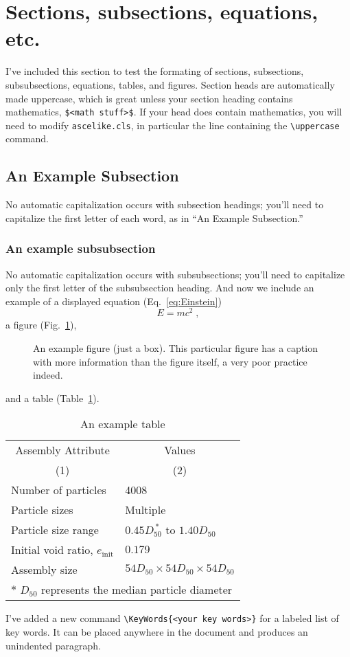 \documentclass[Proceedings]{ascelike}
\begin{document}
\section{Sections, subsections, equations, etc.}
I've included this section to test the formating of sections, subsections,
subsubsections, equations, tables, and figures.
Section heads are automatically made uppercase, which is great unless
your section heading contains mathematics, \verb+$<math stuff>$+.
If your head does contain mathematics, you will need to modify
\texttt{ascelike.cls}, in particular the line containing the
\verb+\uppercase+ command.
%
\subsection{An Example Subsection}
No automatic capitalization occurs with subsection headings; 
you'll need to capitalize the first letter of each word,
as in ``An Example Subsection.''
%
\subsubsection{An example subsubsection}
No automatic capitalization occurs with subsubsections; 
you'll need to capitalize only the first letter of the subsubsection heading.
And now we include an example of a displayed equation (Eq.~\ref{eq:Einstein})
%
\begin{equation} \label{eq:Einstein}
E = m c^{2} \;,
\end{equation}
%
a figure (Fig.~\ref{fig:box_fig}), 
%
\begin{figure}
\centering
\framebox[3.00in]{\rule[0in]{0in}{1.00in}}
\caption{An example figure (just a box).  
This particular figure has a caption with more information 
than the figure itself, a very poor practice indeed.}
\label{fig:box_fig}
\end{figure}
%
and a table (Table~\ref{table:assembly}).
%
\begin{table}
\caption{An example table}
\label{table:assembly}
\centering
\small
\renewcommand{\arraystretch}{1.25}
\begin{tabular}{l | l}
\hline\hline
\multicolumn{1}{c|}{Assembly Attribute} &
\multicolumn{1}{c}{Values} \\
\multicolumn{1}{c|}{(1)} &
\multicolumn{1}{c}{(2)} \\
\hline
Number of particles & 4008 \\
Particle sizes & Multiple  \\
Particle size range & $0.45D_{50}^{\:\ast}$ to $1.40D_{50}$ \\
Initial void ratio, $e_{\mathrm{init}}$ & $0.179$ \\
Assembly size & $54D_{50} \times 54D_{50} \times 54D_{50}$ \\
\hline
\multicolumn{2}{l}{$\ast$ $D_{50}$ represents the median particle diameter} \\
\hline\hline
\end{tabular}
\normalsize
\end{table}
%
\par
I've added a new command \verb+\KeyWords{<your key words>}+ for
a labeled list of key words.  
It can be placed anywhere in the document and produces an unindented
paragraph.
%
\end{document}
